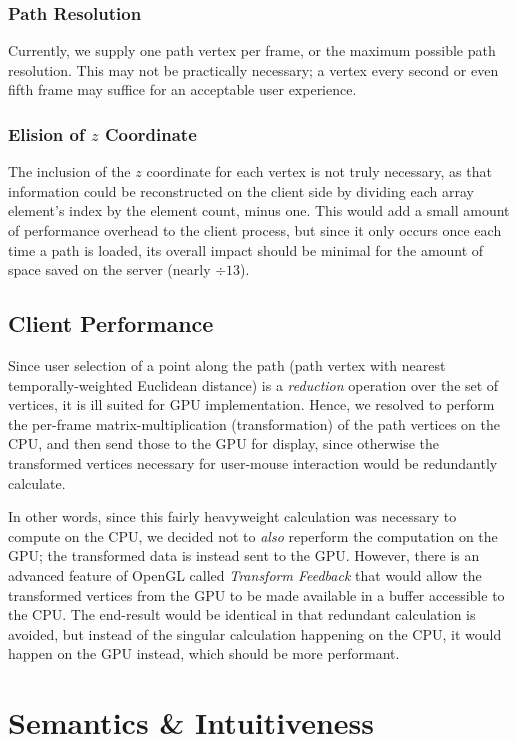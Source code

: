 \subsubsection{Path Resolution}
    Currently, we supply one path vertex per frame, or the maximum possible path resolution. This may not be practically necessary; a vertex every second or even fifth frame may suffice for an acceptable user experience.

\subsubsection{Elision of $z$ Coordinate}
    The inclusion of the $z$ coordinate for each vertex is not truly necessary, as that information could be reconstructed on the client side by dividing each array element's index by the element count, minus one. This would add a small amount of performance overhead to the client process, but since it only occurs once each time a path is loaded, its overall impact should be minimal for the amount of space saved on the server (nearly $\div{1}{3}$).


\subsection{Client Performance}
Since user selection of a point along the path (path vertex with nearest temporally-weighted Euclidean distance) is a \emph{reduction} operation over the set of vertices, it is ill suited for GPU implementation. Hence, we resolved to perform the per-frame matrix-multiplication (transformation) of the path vertices on the CPU, and then send those to the GPU for display, since otherwise the transformed vertices necessary for user-mouse interaction would be redundantly calculate.\par
In other words, since this fairly heavyweight calculation was necessary to compute on the CPU, we decided not to \emph{also} reperform the computation on the GPU; the transformed data is instead sent to the GPU. However, there is an advanced feature of OpenGL called \emph{Transform Feedback} that would allow the transformed vertices from the GPU to be made available in a buffer accessible to the CPU. The end-result would be identical in that redundant calculation is avoided, but instead of the singular calculation happening on the CPU, it would happen on the GPU instead, which should be more performant.



\section{Semantics \& Intuitiveness}

